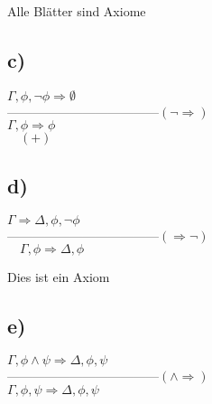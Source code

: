 \documentclass[11pt, a4paper]{article}
\newcommand{\n}{\wedge}
\begin{document}
Alle Blätter sind Axiome


\subsection*{c)}
$\Gamma, \phi, \neg \phi \Rightarrow \emptyset$\\
------------------------------------$(\neg \Rightarrow)$\\
$\Gamma, \phi \Rightarrow \phi$\\
$\quad (+)$

\subsection*{d)}
$\Gamma \Rightarrow \Delta, \phi, \neg \phi$\\
------------------------------------$(\Rightarrow \neg)$\\
$\quad\Gamma, \phi \Rightarrow \Delta, \phi$

Dies ist ein Axiom

\subsection*{e)}
$\Gamma, \phi \n \psi \Rightarrow \Delta, \phi, \psi$\\
------------------------------------$(\n \Rightarrow)$\\
$\Gamma, \phi, \psi \Rightarrow \Delta, \phi, \psi$
\end{document}
